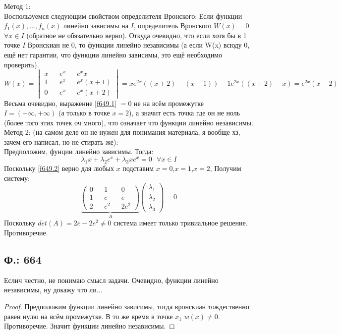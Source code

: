 \documentclass{article}
\begin{document}
Метод 1:\\ 
Воспользуемся следующим свойством определителя Вронского: Если функции $f_1(x),...,f_n(x)$ линейно зависимы на $I$, определитель Вронского $W(x)=0$ $\forall x \in I$ (обратное не обязательно верно). Откуда очевидно, что если хотя бы в 1 точке $I$ Вронскиан не 0, то функции линейно независимы (а если W(x) всюду 0, ещё нет гарантии, что функции линейно зависимы, это ещё необходимо проверить).\\
\begin{equation}\label{f649.1}
    W(x) = 
    \begin{vmatrix}
    x && e^x && e^x x \\
    1 && e^x && e^x(x+1)\\
    0 && e^x && e^x(x+2)
    \end{vmatrix}
    =x e^{2x} ((x+2)-(x+1))-1 e^{2x}((x+2)-x) = e^{2x}(x-2)
\end{equation}
Весьма очевидно, выражение \ref{f649.1} $ =0$ не на всём промежутке $I=(-\infty,+\infty)$ (а только в точке $x=2$), а значит есть точка где он не ноль (более того этих точек оч много), что означает что функции линейно независимы.\\

Метод 2: (на самом деле он не нужен для понимания материала, я вообще хз, зачем его написал, но не стирать же):\\
Предположим, фунции линейно зависимы. Тогда:
\begin{equation}\label{f649.2}
    \lambda_1 x + \lambda_2 e^x + \lambda_3 x e^x = 0 \text{ } \forall x \in I
\end{equation}
Поскольку \ref{f649.2} верно для любых $x$ подставим $x=0$,$x=1$,$x=2$, Получим систему:
\begin{equation}
    \underbrace{
    \begin{pmatrix}
    0 && 1 && 0\\
    1 && e && e\\
    2 && e^2 && 2e^2
    \end{pmatrix}}_{A}
    \begin{pmatrix}
    \lambda_1\\
    \lambda_2\\
    \lambda_3
    \end{pmatrix}
    =0
\end{equation}
 Поскольку $det(A)=2 e - 2 e^2 \neq 0$ система имеет только тривиальное решение. Противоречие. 
 \subsection{Ф.: 664}
 Еслич честно, не понимаю смысл задачи. Очевидно, функции линейно независимы, ну докажу что ли...
 \begin{proof}
Предположим функции линейно зависимы, тогда вронскиан тождественно равен нулю на всём промежутке. В то же время в точке $x_1$ $w(x) \neq 0$. Противоречие. Значит функции линейно независимы. 
 \end{proof}
\end{document}
